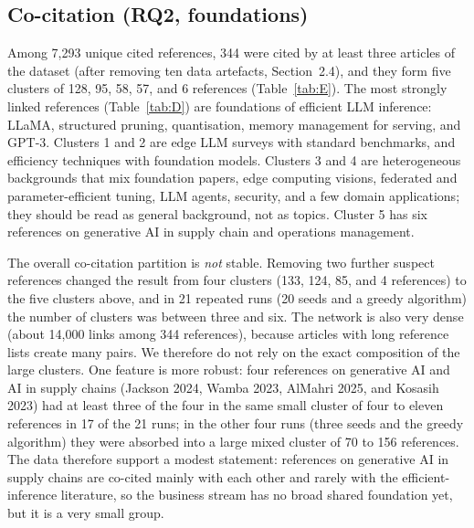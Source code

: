 \subsection{Co-citation (RQ2, foundations)}
Among 7{,}293 unique cited references, 344 were cited by at least three articles of the dataset (after removing ten data artefacts, Section~2.4), and they form five clusters of 128, 95, 58, 57, and 6 references (Table~\ref{tab:E}). The most strongly linked references (Table~\ref{tab:D}) are foundations of efficient LLM inference: LLaMA, structured pruning, quantisation, memory management for serving, and GPT-3. Clusters 1 and 2 are edge LLM surveys with standard benchmarks, and efficiency techniques with foundation models. Clusters 3 and 4 are heterogeneous backgrounds that mix foundation papers, edge computing visions, federated and parameter-efficient tuning, LLM agents, security, and a few domain applications; they should be read as general background, not as topics. Cluster 5 has six references on generative AI in supply chain and operations management.

The overall co-citation partition is \emph{not} stable. Removing two further suspect references changed the result from four clusters (133, 124, 85, and 4 references) to the five clusters above, and in 21 repeated runs (20 seeds and a greedy algorithm) the number of clusters was between three and six. The network is also very dense (about 14{,}000 links among 344 references), because articles with long reference lists create many pairs. We therefore do not rely on the exact composition of the large clusters. One feature is more robust: four references on generative AI and AI in supply chains (Jackson 2024, Wamba 2023, AlMahri 2025, and Kosasih 2023) had at least three of the four in the same small cluster of four to eleven references in 17 of the 21 runs; in the other four runs (three seeds and the greedy algorithm) they were absorbed into a large mixed cluster of 70 to 156 references. The data therefore support a modest statement: references on generative AI in supply chains are co-cited mainly with each other and rarely with the efficient-inference literature, so the business stream has no broad shared foundation yet, but it is a very small group. 




